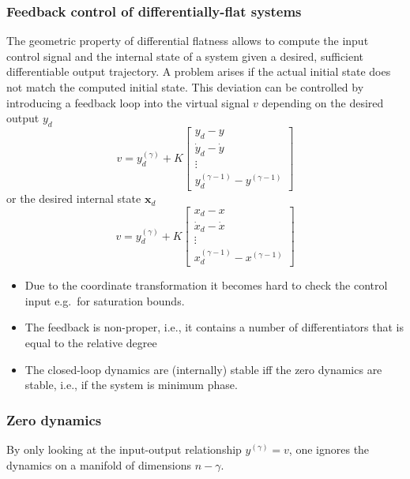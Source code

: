 \subsubsection{Feedback control of differentially-flat systems}
The geometric property of differential flatness allows to compute the input control signal and the internal state of a system given a desired, sufficient differentiable output trajectory. A problem arises if the actual initial state does not match the computed initial state. This deviation can be controlled by introducing a feedback loop into the virtual signal $v$ depending on the desired output $y_d$
\begin{equation*}
    v = y_d^{(\gamma)} + K \begin{bmatrix}
        y_d - y             \\
        \dot{y}_d - \dot{y} \\
        \vdots              \\
        y_d^{(\gamma-1)} - y^{(\gamma-1)}
    \end{bmatrix}
\end{equation*}
or the desired internal state $\mathbf{x}_d$
\begin{equation*}
    v = y_d^{(\gamma)} + K \begin{bmatrix}
        x_d - x             \\
        \dot{x}_d - \dot{x} \\
        \vdots              \\
        x_d^{(\gamma-1)} - x^{(\gamma-1)}
    \end{bmatrix}
\end{equation*}

\newpar{}
\begin{itemize}
    \item Due to the coordinate transformation it becomes hard to check the control input e.g.\ for saturation bounds.
    \item The feedback is non-proper, i.e., it contains a number of differentiators that is equal to the relative degree
    \item The closed-loop dynamics are (internally) stable iff the zero dynamics are stable, i.e., if the system is minimum phase.
\end{itemize}

\subsubsection{Zero dynamics} 
By only looking at the input-output relationship $y^{(\gamma)}=v$, one ignores the dynamics on a manifold of dimensions $n-\gamma$.

